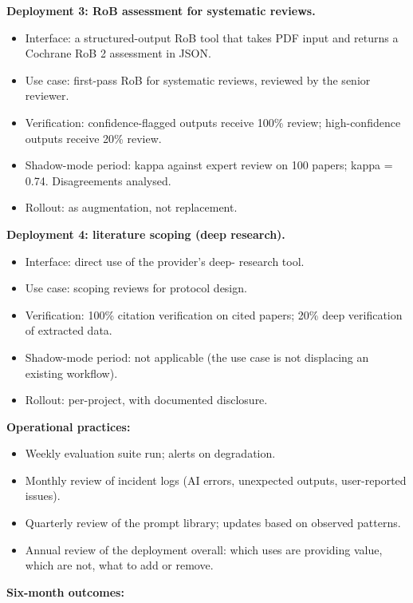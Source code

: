 \documentclass[
  letterpaper,
  11pt]{scrbook}
\providecommand{\tightlist}{%
  \setlength{\itemsep}{0pt}\setlength{\parskip}{0pt}}
\begin{document}
\textbf{Deployment 3: RoB assessment for systematic reviews.}

\begin{itemize}
\tightlist
\item
  Interface: a structured-output RoB tool that takes PDF input and
  returns a Cochrane RoB 2 assessment in JSON.
\item
  Use case: first-pass RoB for systematic reviews, reviewed by the
  senior reviewer.
\item
  Verification: confidence-flagged outputs receive 100\% review;
  high-confidence outputs receive 20\% review.
\item
  Shadow-mode period: kappa against expert review on 100 papers; kappa =
  0.74. Disagreements analysed.
\item
  Rollout: as augmentation, not replacement.
\end{itemize}

\textbf{Deployment 4: literature scoping (deep research).}

\begin{itemize}
\tightlist
\item
  Interface: direct use of the provider's deep- research tool.
\item
  Use case: scoping reviews for protocol design.
\item
  Verification: 100\% citation verification on cited papers; 20\% deep
  verification of extracted data.
\item
  Shadow-mode period: not applicable (the use case is not displacing an
  existing workflow).
\item
  Rollout: per-project, with documented disclosure.
\end{itemize}

\textbf{Operational practices:}

\begin{itemize}
\tightlist
\item
  Weekly evaluation suite run; alerts on degradation.
\item
  Monthly review of incident logs (AI errors, unexpected outputs,
  user-reported issues).
\item
  Quarterly review of the prompt library; updates based on observed
  patterns.
\item
  Annual review of the deployment overall: which uses are providing
  value, which are not, what to add or remove.
\end{itemize}

\textbf{Six-month outcomes:}
\end{document}

